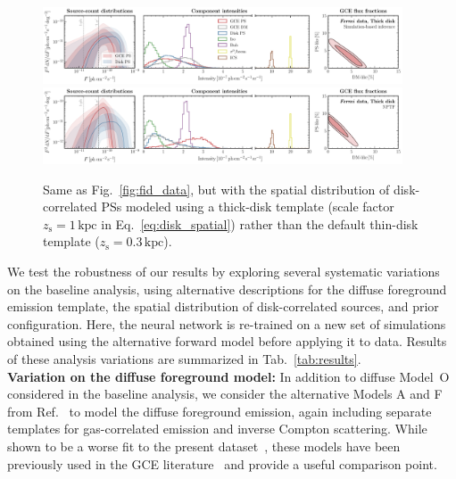 \documentclass[prd,aps,10pt,nofootinbib,twocolumn,superscriptaddress,preprintnumbers,balancelastpage,longbibliography,floatfix]{revtex4-2}
\begin{document}
%
\begin{figure}[!htbp]
\centering
\includegraphics[width=0.95\textwidth]{data_fid_sbi_thick.pdf}
\includegraphics[width=0.95\textwidth]{data_fid_nptf_thick.pdf}
\caption{Same as Fig.~\ref{fig:fid_data}, but with the spatial distribution of disk-correlated PSs modeled using a thick-disk template (scale factor $z_\mathrm{s}=1\,\mathrm{kpc}$ in Eq.~\eqref{eq:disk_spatial}) rather than the default thin-disk template ($z_\mathrm{s}=0.3\,\mathrm{kpc}$).}
\label{fig:fid_data_thick_disk}
\end{figure}
%

We test the robustness of our results by exploring several systematic variations on the baseline analysis, using alternative descriptions for the diffuse foreground emission template, the spatial distribution of disk-correlated sources, and prior configuration. Here, the neural network is re-trained on a new set of simulations obtained using the alternative forward model before applying it to \Fermi data. Results of these analysis variations are summarized in Tab.~\ref{tab:results}. \\

\noindent
\textbf{Variation on the diffuse foreground model:}
In addition to diffuse {Model~O} considered in the baseline analysis, we consider the alternative Models A and F from Ref.~\cite{Calore:2014xka} to model the diffuse foreground emission, again including separate templates for gas-correlated emission and inverse Compton scattering. While shown to be a worse fit to the present dataset~\cite{Buschmann:2020adf}, these models have been previously used in the GCE literature~\cite{Buschmann:2020adf,Leane:2020pfc,Leane:2020nmi} and provide a useful comparison point.
\end{document}
